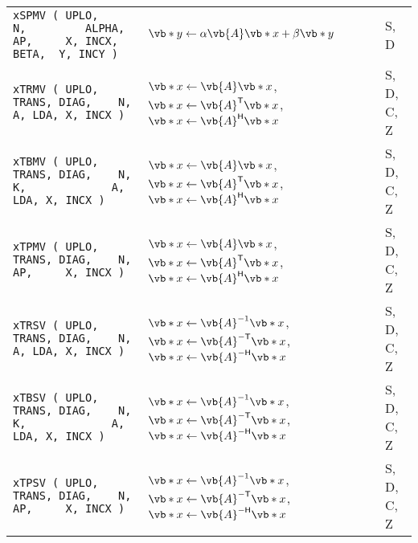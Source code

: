 \documentclass[10pt,a3paper, landscape]{article}
\newcommand{\T}{\mathsf{T}}
\renewcommand{\H}{\mathsf{H}}
\begin{document}
\begin{tabular}{lll}
		\verb|xSPMV ( UPLO,                 N,         ALPHA, AP,     X, INCX, BETA,  Y, INCY )        | & $\vb*{y} \gets \alpha \vb{A} \vb*{x} + \beta \vb*{y}$                                                                                                                                                                                                        & S, D               \\
		\verb|xTRMV ( UPLO, TRANS, DIAG,    N,                A, LDA, X, INCX )                        | & $\vb*{x} \gets \vb{A} \vb*{x}$, $\vb*{x} \gets \vb{A}^{\T} \vb*{x}$, $\vb*{x} \gets \vb{A}^{\H} \vb*{x}$                                                                                                                                                     & S, D, C, Z         \\
		\verb|xTBMV ( UPLO, TRANS, DIAG,    N, K,             A, LDA, X, INCX )                        | & $\vb*{x} \gets \vb{A} \vb*{x}$, $\vb*{x} \gets \vb{A}^{\T} \vb*{x}$, $\vb*{x} \gets \vb{A}^{\H} \vb*{x}$                                                                                                                                                     & S, D, C, Z         \\
		\verb|xTPMV ( UPLO, TRANS, DIAG,    N,                AP,     X, INCX )                        | & $\vb*{x} \gets \vb{A} \vb*{x}$, $\vb*{x} \gets \vb{A}^{\T} \vb*{x}$, $\vb*{x} \gets \vb{A}^{\H} \vb*{x}$                                                                                                                                                     & S, D, C, Z         \\
		\verb|xTRSV ( UPLO, TRANS, DIAG,    N,                A, LDA, X, INCX )                        | & $\vb*{x} \gets \vb{A}^{-1} \vb*{x}$, $\vb*{x} \gets \vb{A}^{-\T} \vb*{x}$, $\vb*{x} \gets \vb{A}^{-\H} \vb*{x}$                                                                                                                                              & S, D, C, Z         \\
		\verb|xTBSV ( UPLO, TRANS, DIAG,    N, K,             A, LDA, X, INCX )                        | & $\vb*{x} \gets \vb{A}^{-1} \vb*{x}$, $\vb*{x} \gets \vb{A}^{-\T} \vb*{x}$, $\vb*{x} \gets \vb{A}^{-\H} \vb*{x}$                                                                                                                                              & S, D, C, Z         \\
		\verb|xTPSV ( UPLO, TRANS, DIAG,    N,                AP,     X, INCX )                        | & $\vb*{x} \gets \vb{A}^{-1} \vb*{x}$, $\vb*{x} \gets \vb{A}^{-\T} \vb*{x}$, $\vb*{x} \gets \vb{A}^{-\H} \vb*{x}$                                                                                                                                              & S, D, C, Z         \\

\end{tabular}
\end{document}
